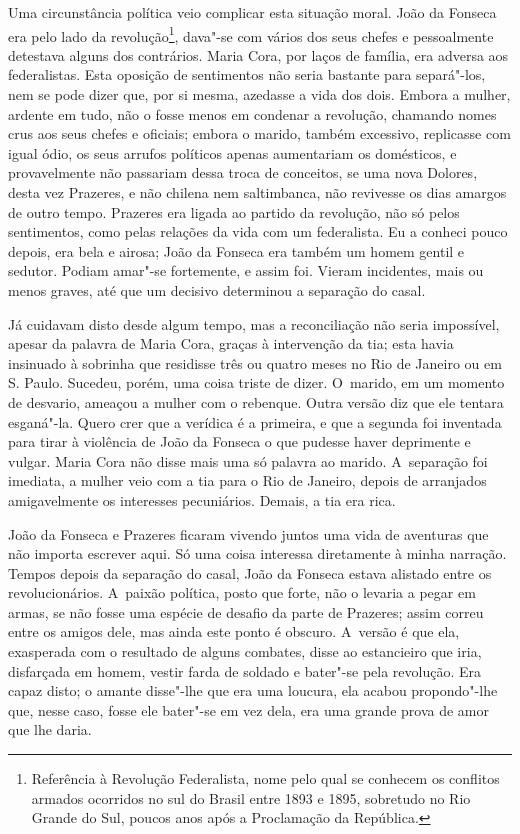 Uma circunstância política veio complicar esta situação moral. João da
Fonseca era pelo lado da revolução\footnote{Referência à Revolução
  Federalista, nome pelo qual se conhecem os conflitos armados ocorridos
  no sul do Brasil entre 1893 e 1895, sobretudo no Rio Grande do Sul,
  poucos anos após a Proclamação da República.}, dava"-se com vários dos
seus chefes e pessoalmente detestava alguns dos contrários. Maria Cora,
por laços de família, era adversa aos federalistas. Esta oposição de
sentimentos não seria bastante para separá"-los, nem se pode dizer que,
por si mesma, azedasse a vida dos dois. Embora a mulher, ardente em
tudo, não o fosse menos em condenar a revolução, chamando nomes crus aos
seus chefes e oficiais; embora o marido, também excessivo, replicasse
com igual ódio, os seus arrufos políticos apenas aumentariam os
domésticos, e provavelmente não passariam dessa troca de conceitos, se
uma nova Dolores, desta vez Prazeres, e não chilena nem saltimbanca, não
revivesse os dias amargos de outro tempo. Prazeres era ligada ao partido
da revolução, não só pelos sentimentos, como pelas relações da vida com
um federalista. Eu a conheci pouco depois, era bela e airosa; João da
Fonseca era também um homem gentil e sedutor. Podiam amar"-se fortemente,
e assim foi. Vieram incidentes, mais ou menos graves, até que um
decisivo determinou a separação do casal.

Já cuidavam disto desde algum tempo, mas a reconciliação não seria
impossível, apesar da palavra de Maria Cora, graças à intervenção da
tia; esta havia insinuado à sobrinha que residisse três ou quatro meses
no Rio de Janeiro ou em S. Paulo. Sucedeu, porém, uma coisa triste de
dizer. O~marido, em um momento de desvario, ameaçou a mulher com o
rebenque. Outra versão diz que ele tentara esganá"-la. Quero crer que a
verídica é a primeira, e que a segunda foi inventada para tirar à
violência de João da Fonseca o que pudesse haver deprimente e vulgar.
Maria Cora não disse mais uma só palavra ao marido. A~separação foi
imediata, a mulher veio com a tia para o Rio de Janeiro, depois de
arranjados amigavelmente os interesses pecuniários. Demais, a tia era
rica.

João da Fonseca e Prazeres ficaram vivendo juntos uma vida de aventuras
que não importa escrever aqui. Só uma coisa interessa diretamente à
minha narração. Tempos depois da separação do casal, João da Fonseca
estava alistado entre os revolucionários. A~paixão política, posto que
forte, não o levaria a pegar em armas, se não fosse uma espécie de
desafio da parte de Prazeres; assim correu entre os amigos dele, mas
ainda este ponto é obscuro. A~versão é que ela, exasperada com o
resultado de alguns combates, disse ao estancieiro que iria, disfarçada
em homem, vestir farda de soldado e bater"-se pela revolução. Era capaz
disto; o amante disse"-lhe que era uma loucura, ela acabou propondo"-lhe
que, nesse caso, fosse ele bater"-se em vez dela, era uma grande prova de
amor que lhe daria.

